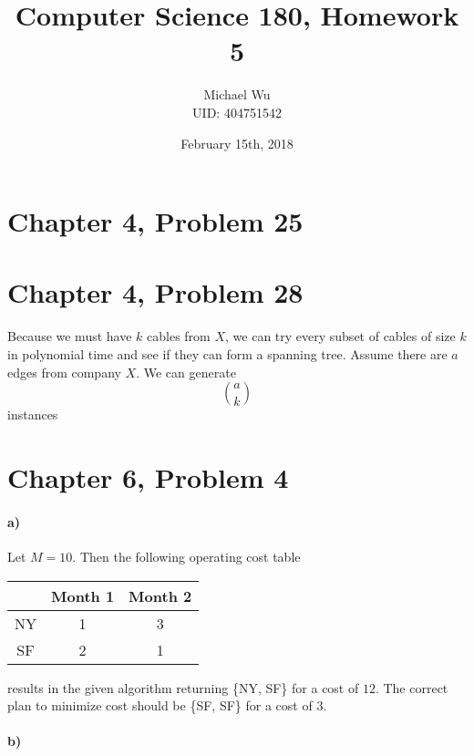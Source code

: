 \documentclass[12pt]{article}
\begin{document}
\title{Computer Science 180, Homework 5}
\date{February 15th, 2018}
\author{Michael Wu\\UID: 404751542}
\maketitle

\section*{Chapter 4, Problem 25}

\pagebreak

\section*{Chapter 4, Problem 28}

Because we must have \(k\) cables from \(X\), we can try every subset of cables of size \(k\) in polynomial time and see if
they can form a spanning tree. Assume there are \(a\) edges from company \(X\). We can generate
\[\binom{a}{k}\]
instances 

\pagebreak

\section*{Chapter 6, Problem 4}

\paragraph{a)}

Let \(M=10\). Then the following operating cost table
\begin{center}
        \begin{tabular}{c | c c}
                & Month 1 & Month 2\\
                \hline
                NY & 1 & 3\\
                SF & 2 & 1\\
        \end{tabular}
\end{center}
results in the given algorithm returning \{NY, SF\} for a cost of \(12\). The correct plan to minimize
cost should be \{SF, SF\} for a cost of \(3\).

\paragraph{b)}
\end{document}
